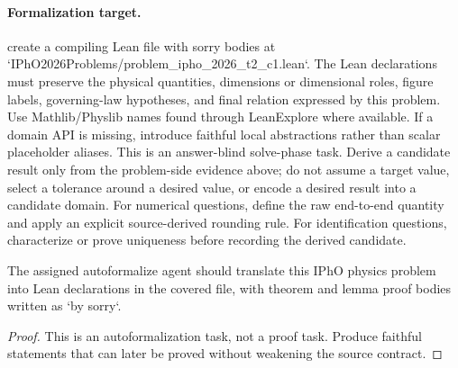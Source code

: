\paragraph{Formalization target.}
create a compiling Lean file with sorry bodies at `IPhO2026Problems/problem\_ipho\_2026\_t2\_c1.lean`.
The Lean declarations must preserve the physical quantities, dimensions or dimensional roles, figure labels, governing-law hypotheses, and final relation expressed by this problem.
Use Mathlib/Physlib names found through LeanExplore where available. If a domain API is missing, introduce faithful local abstractions rather than scalar placeholder aliases.
This is an answer-blind solve-phase task. Derive a candidate result only from the problem-side evidence above; do not assume a target value, select a tolerance around a desired value, or encode a desired result into a candidate domain.
For numerical questions, define the raw end-to-end quantity and apply an explicit source-derived rounding rule. For identification questions, characterize or prove uniqueness before recording the derived candidate.

\begin{theorem}
\label{thm:physics:ipho_2026_t2_c1:target}
\leanok
The assigned autoformalize agent should translate this IPhO physics problem into Lean declarations in the covered file, with theorem and lemma proof bodies written as `by sorry`.
\end{theorem}
\begin{proof}
This is an autoformalization task, not a proof task. Produce faithful statements that can later be proved without weakening the source contract.
\end{proof}
